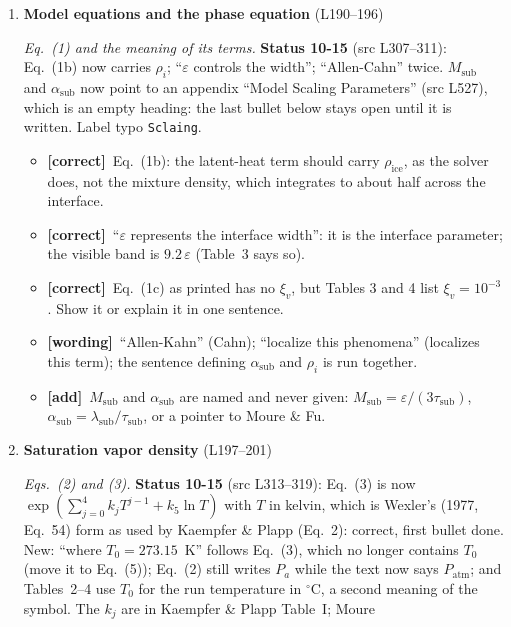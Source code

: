 \documentclass[11pt]{article}
\newcommand{\Pg}[3]{\item \textbf{#1} {\small(#2)}\par\textit{#3}}
\newcommand{\tC}{\textcolor{miss}{\textbf{[correct]}}\ }
\newcommand{\tG}{\textcolor{stale}{\textbf{[wording]}}\ }
\newcommand{\tA}{\textcolor{have}{\textbf{[add]}}\ }
\newcommand{\add}[1]{\textcolor{revX}{#1}}
\begin{document}
\begin{enumerate}
\Pg{Model equations and the phase equation}{L190--196}{Eq.~(1) and the meaning of its terms.}
  \add{\textbf{Status 10-15} (src L307--311): Eq.~(1b) now carries
  $\rho_i$; ``$\varepsilon$ controls the width''; ``Allen-Cahn'' twice.
  $M_{\mathrm{sub}}$ and $\alpha_{\mathrm{sub}}$ now point to an appendix
  ``Model Scaling Parameters'' (src L527), which is an empty heading: the
  last bullet below stays open until it is written. Label typo
  \texttt{Sclaing}.}
  \begin{itemize}
  \item \tC Eq.~(1b): the latent-heat term should carry $\rho_{\mathrm{ice}}$,
    as the solver does, not the mixture density, which integrates to about
    half across the interface.
  \item \tC ``$\varepsilon$ represents the interface width'': it is the
    interface parameter; the visible band is $9.2\,\varepsilon$ (Table~3
    says so).
  \item \tC Eq.~(1c) as printed has no $\xi_v$, but Tables 3 and 4 list
    $\xi_v = 10^{-3}$. Show it or explain it in one sentence.
  \item \tG ``Allen-Kahn'' (Cahn); ``localize this phenomena'' (localizes
    this term); the sentence defining $\alpha_{\mathrm{sub}}$ and $\rho_i$
    is run together.
  \item \tA $M_{\mathrm{sub}}$ and $\alpha_{\mathrm{sub}}$ are named and never
    given: $M_{\mathrm{sub}} = \varepsilon/(3\tau_{\mathrm{sub}})$,
    $\alpha_{\mathrm{sub}} = \lambda_{\mathrm{sub}}/\tau_{\mathrm{sub}}$,
    or a pointer to Moure \& Fu.
  \end{itemize}
\Pg{Saturation vapor density}{L197--201}{Eqs.~(2) and (3).}
  \add{\textbf{Status 10-15} (src L313--319): Eq.~(3) is now
  $\exp(\sum_{j=0}^{4} k_j T^{j-1} + k_5\ln T)$ with $T$ in kelvin, which is
  Wexler's (1977, Eq.~54) form as used by Kaempfer \& Plapp (Eq.~2):
  correct, first bullet done. New: ``where $T_0 = 273.15$~K'' follows
  Eq.~(3), which no longer contains $T_0$ (move it to Eq.~(5)); Eq.~(2)
  still writes $P_a$ while the text now says $P_{\mathrm{atm}}$; and
  Tables~2--4 use $T_0$ for the run temperature in $^{\circ}$C, a second
  meaning of the symbol. The $k_j$ are in Kaempfer \& Plapp Table~I; Moure
}
\end{enumerate}
\end{document}
